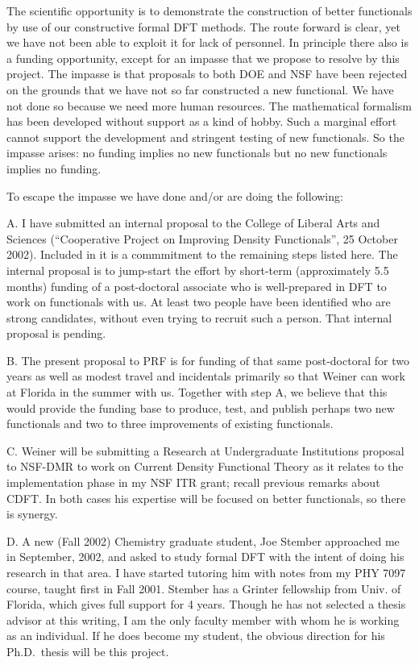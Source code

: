\documentclass[nofootinbib,floatfix,aps,pra,preprint]{revtex4}
\begin{document}
\textrm{The scientific opportunity is to demonstrate the construction of
better functionals by use of our constructive formal DFT methods. The route
forward is clear, yet we have not been able to exploit it for lack of
personnel. In principle there also is a funding opportunity, except for an
impasse that we propose to resolve by this project. The impasse is that
proposals to both DOE and NSF have been rejected on the grounds that we have
not so far constructed a new functional. We have not done so because we need
more human resources. The mathematical formalism has been developed without
support as a kind of hobby. Such a marginal effort cannot support the
development and stringent testing of new functionals. So the impasse arises:
no funding implies no new functionals but no new functionals implies no
funding. }

\textrm{To escape the impasse we have done and/or are doing the following: }

\textrm{A. I have submitted an internal proposal to the College of Liberal
Arts and Sciences (``Cooperative Project on Improving Density Functionals'',
25 October 2002). Included in it is a commmitment to the remaining steps
listed here. The internal proposal is to jump-start the effort by short-term
(approximately 5.5 months) funding of a post-doctoral associate who is
well-prepared in DFT to work on functionals with us. At least two people
have been identified who are strong candidates, without even trying to
recruit such a person. That internal proposal is pending. }

\textrm{B. The present proposal to PRF is for funding of that same
post-doctoral for two years as well as modest travel and incidentals
primarily so that Weiner can work at Florida in the summer with us. Together
with step A, we believe that this would provide the funding base to produce,
test, and publish perhaps two new functionals and two to three improvements
of existing functionals. }

\textrm{C. Weiner will be submitting a Research at Undergraduate
Institutions proposal to NSF-DMR to work on Current Density Functional
Theory as it relates to the implementation phase in my NSF ITR grant; recall
previous remarks about CDFT. In both cases his expertise will be focused on
better functionals, so there is synergy. }

\textrm{D. A new (Fall 2002) Chemistry graduate student, Joe Stember
approached me in September, 2002, and asked to study formal DFT with the
intent of doing his research in that area. I have started tutoring him with
notes from my PHY 7097 course, taught first in Fall 2001. Stember has a
Grinter fellowship from Univ. of Florida, which gives full support for 4
years. Though he has not selected a thesis advisor at this writing, I am the
only faculty member with whom he is working as an individual. If he does
become my student, the obvious direction for his Ph.D.~thesis will be this
project. }
\end{document}
